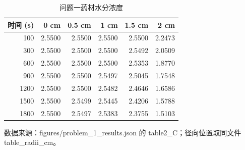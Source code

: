 \begin{table}[H]
  \centering
  \caption{问题一药材水分浓度}
  \label{tab:q1_C}
  \begin{tabular}{rrrrrr}
    \toprule
    时间 (s) & 0 cm & 0.5 cm & 1 cm & 1.5 cm & 2 cm \\
    \midrule
    100 & 2.5500 & 2.5500 & 2.5500 & 2.5500 & 2.2473 \\
    300 & 2.5500 & 2.5500 & 2.5500 & 2.5492 & 2.0509 \\
    600 & 2.5500 & 2.5500 & 2.5500 & 2.5353 & 1.8770 \\
    900 & 2.5500 & 2.5500 & 2.5497 & 2.5045 & 1.7548 \\
    1200 & 2.5500 & 2.5500 & 2.5482 & 2.4646 & 1.6586 \\
    1500 & 2.5500 & 2.5499 & 2.5445 & 2.4206 & 1.5788 \\
    1800 & 2.5500 & 2.5497 & 2.5383 & 2.3755 & 1.5103 \\
    \bottomrule
  \end{tabular}
  \par\vspace{2pt}\footnotesize 数据来源：figures/problem\_1\_results.json 的 table2\_C；径向位置取同文件 table\_radii\_cm。
\end{table}
